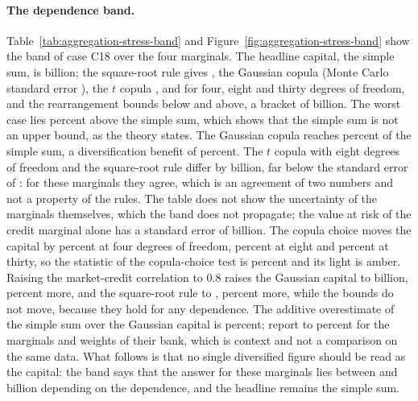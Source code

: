 \paragraph{The dependence band.}
Table~\ref{tab:aggregation-stress-band} and Figure~\ref{fig:aggregation-stress-band} show the band of case C18 over the four
marginals. The headline capital, the simple sum, is {\agstBandSum} billion; the square-root rule gives {\agstBandVc}, the
Gaussian copula {\agstBandGauss} (Monte Carlo standard error {\agstSeGauss}), the $t$ copula {\agstBandTFour}, {\agstBandTEight}
and {\agstBandTThirty} for four, eight and thirty degrees of freedom, and the rearrangement bounds {\agstBandLower} below and
{\agstBandWorst} above, a bracket of {\agstBandWidth} billion. The worst case lies {\agstWorstOverSum} percent above the simple
sum, which shows that the simple sum is not an upper bound, as the theory states. The Gaussian copula reaches {\agstGaussShare}
percent of the simple sum, a diversification benefit of {\agstDivBenefit} percent. The $t$ copula with eight degrees of freedom
and the square-root rule differ by {\agstDiffTEightVc} billion, far below the standard error of {\agstSeTEight}: for these
marginals they agree, which is an agreement of two numbers and not a property of the rules. The table does not show the
uncertainty of the marginals themselves, which the band does not propagate; the value at risk of the credit marginal alone has a
standard error of {\agstCreditSe} billion. The copula choice moves the capital by {\agstCopRelFour} percent at four degrees of
freedom, {\agstCopRelEight} percent at eight and {\agstCopRelThirty} percent at thirty, so the statistic of the copula-choice test
is {\agstCopStat} percent and its light is amber. Raising the market-credit correlation to 0.8 raises the Gaussian capital to
{\agstStressGauss} billion, {\agstStressRise} percent more, and the square-root rule to {\agstStressVc}, {\agstStressRiseVc}
percent more, while the bounds do not move, because they hold for any dependence. The additive overestimate of the simple sum
over the Gaussian capital is {\agstRsOver} percent; \citet{aggregation-stress:rosenberg2006} report {\agstRsLow} to {\agstRsHigh} percent
for the marginals and weights of their bank, which is context and not a comparison on the same data. What follows is that no single diversified figure should be read as the capital:
the band says that the answer for these marginals lies between {\agstBandLower} and {\agstBandWorst} billion depending on the
dependence, and the headline remains the simple sum.

